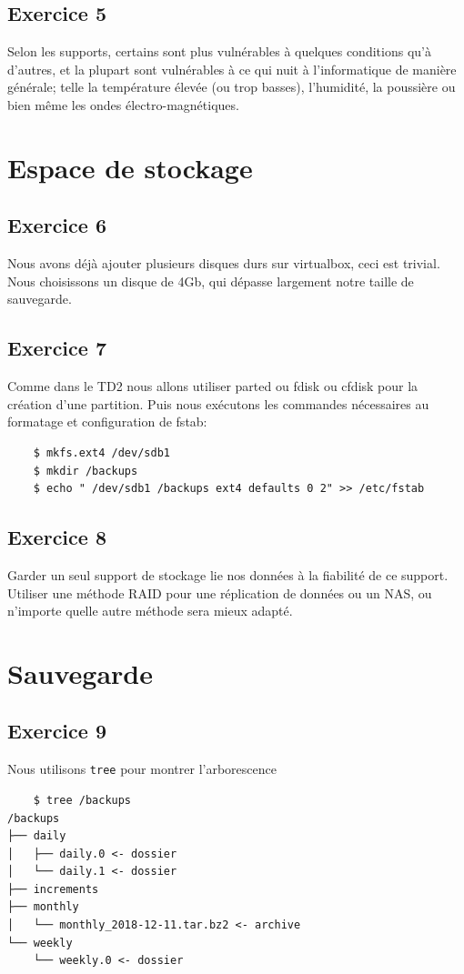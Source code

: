 \documentclass{report}
\begin{document}
\subsection{Exercice 5}
Selon les supports, certains sont plus vulnérables à quelques conditions qu'à d'autres, et la
plupart sont vulnérables à ce qui nuit à l'informatique de manière générale; telle la température
élevée (ou trop basses), l'humidité, la poussière ou bien même les ondes électro-magnétiques.

\section{Espace de stockage}
\subsection{Exercice 6}
Nous avons déjà ajouter plusieurs disques durs sur virtualbox, ceci est trivial.
Nous choisissons un disque de 4Gb, qui dépasse largement notre taille de sauvegarde.
\subsection{Exercice 7}
Comme dans le TD2 nous allons utiliser parted ou fdisk ou cfdisk pour la création d'une partition.
Puis nous exécutons les commandes nécessaires au formatage et configuration de fstab:
\begin{tcolorbox}
  \begin{verbatim}
    $ mkfs.ext4 /dev/sdb1
    $ mkdir /backups
    $ echo " /dev/sdb1 /backups ext4 defaults 0 2" >> /etc/fstab
  \end{verbatim}
\end{tcolorbox}
\subsection{Exercice 8}
Garder un seul support de stockage lie nos données à la fiabilité de ce support. Utiliser une méthode
RAID pour une réplication de données ou un NAS, ou n'importe quelle autre méthode sera mieux adapté.

\section{Sauvegarde}

\subsection{Exercice 9}
Nous utilisons \texttt{tree} pour montrer l'arborescence
\begin{tcolorbox}
  \begin{verbatim}
    $ tree /backups
/backups
├── daily
│   ├── daily.0 <- dossier
│   └── daily.1 <- dossier
├── increments
├── monthly
│   └── monthly_2018-12-11.tar.bz2 <- archive
└── weekly
    └── weekly.0 <- dossier
  \end{verbatim}
\end{tcolorbox}
\newpage
\end{document}
